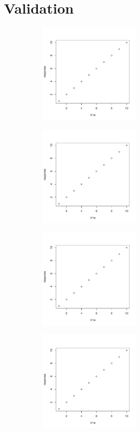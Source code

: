 \documentclass[12pt]{article}
\begin{document}
\section{Validation}
\label{sec:val}

\begin{figure}[t]
	\centering
	\begin{subfigure}[b]{0.45\textwidth}
		\includegraphics[width=\textwidth, height = 2in]{fig1.pdf}
		\subcaption{}
	\end{subfigure}	\hfill	
	\begin{subfigure}[b]{0.45\textwidth}
		\includegraphics[width=\textwidth, height = 2in]{fig1.pdf}
		\subcaption{}
	\end{subfigure}
	\begin{subfigure}[b]{0.45\textwidth}
		\includegraphics[width=\textwidth, height = 2in]{fig1.pdf}
		\subcaption{}
	\end{subfigure}\hfill
	\begin{subfigure}[b]{0.45\textwidth}
		\includegraphics[width=\textwidth, height = 2in]{fig1.pdf}

\end{subfigure}
\end{figure}
\end{document}
